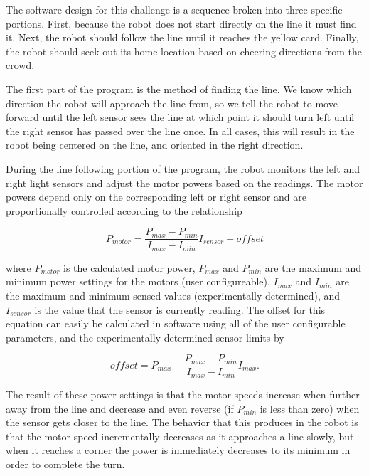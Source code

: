 \documentclass[journal]{../IEEEtran}
\begin{document}
The software design for this challenge is a sequence broken into three specific portions. First, because the robot does not start directly on the line it must find it. Next, the robot should follow the line until it reaches the yellow card. Finally, the robot should seek out its home location based on cheering directions from the crowd.

The first part of the program is the method of finding the line. We know which direction the robot will approach the line from, so we tell the robot to move forward until the left sensor sees the line at which point it should turn left until the right sensor has passed over the line once. In all cases, this will result in the robot being centered on the line, and oriented in the right direction. 

During the line following portion of the program, the robot monitors the left and right light sensors and adjust the motor powers based on the readings. The motor powers depend only on the corresponding left or right sensor and are proportionally controlled according to the relationship 

\begin{equation}\label{E.motor_speed}
    P_{motor} = \frac{P_{max}-P_{min}}{I_{max}-I_{min}}I_{sensor} + offset
\end{equation}

where $P_{motor}$ is the calculated motor power, $P_{max}$ and $P_{min}$ are the maximum and minimum power settings for the motors (user configureable), $I_{max}$ and $I_{min}$ are the maximum and minimum sensed values (experimentally determined), and $I_{sensor}$ is the value that the sensor is currently reading. The offset for this equation can easily be calculated in software using all of the user configurable parameters, and the experimentally determined sensor limits by

\begin{equation}\label{E.motor_speed}
    offset = P_{max} - \frac{P_{max}-P_{min}}{I_{max}-I_{min}}I_{max}.
\end{equation}

The result of these power settings is that the motor speeds increase when further away from the line and decrease and even reverse (if $P_{min}$ is less than zero) when the sensor gets closer to the line. The behavior that this produces in the robot is that the motor speed incrementally decreases as it approaches a line slowly, but when it reaches a corner the power is immediately decreases to its minimum in order to complete the turn. 
\end{document}
